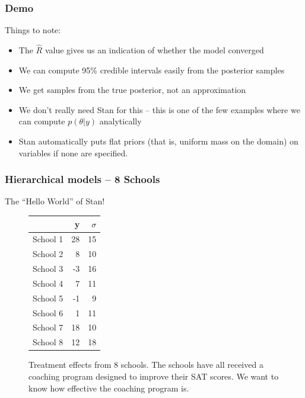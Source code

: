 \documentclass{beamer}
\begin{document}
\begin{frame}
	\frametitle{Demo}
	Things to note:
	\begin{itemize}
		\item The $\hat{R}$ value gives us an indication of whether the model converged
		\item We can compute 95\% credible intervals easily from the posterior samples
		\item We get samples from the true posterior, not an approximation
		\item We don't really need Stan for this -- this is one of the few examples where we can compute $p(\theta | y)$ analytically
		\item Stan automatically puts flat priors (that is, uniform mass on the domain) on variables if none are specified.
	\end{itemize}
\end{frame}

\begin{frame}
	\frametitle{Hierarchical models -- 8 Schools}
	The ``Hello World'' of Stan!
\centering
\begin{figure}
\begin{tabular}{lrr}
\toprule
{} &   y &  $\sigma$ \\
\midrule
School 1 &  28 &     15 \\
School 2 &   8 &     10 \\
School 3 &  -3 &     16 \\
School 4 &   7 &     11 \\
School 5 &  -1 &      9 \\
School 6 &   1 &     11 \\
School 7 &  18 &     10 \\
School 8 &  12 &     18 \\
\bottomrule
\end{tabular}
\caption{Treatment effects from 8 schools. The schools have all received a coaching program designed to improve their SAT scores. We want to know how effective the coaching program is.}
\end{figure}
\end{frame}
\end{document}
